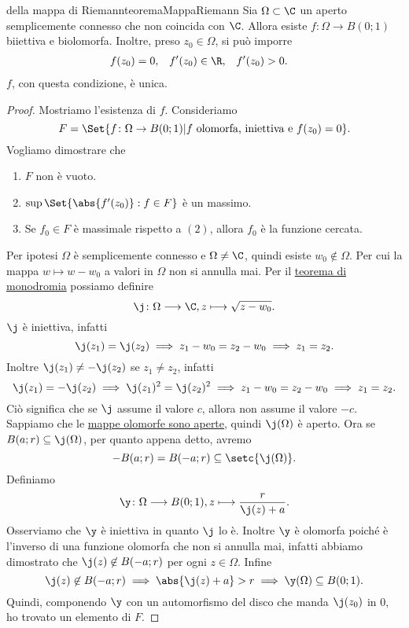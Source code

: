 \begin{teor}{della mappa di Riemann}{teoremaMappaRiemann}
	Sia \(\Omega\subset\C\) un aperto semplicemente connesso che non coincida con \(\C\).
	Allora esiste \(f\colon \Omega \to B(0;1)\) biiettiva e biolomorfa.
	Inoltre, preso \(z_0\in\Omega\), si può imporre
	\begin{align*}
		f(z_0) & = 0, & f'(z_0) & \in \R, & f'(z_0) & > 0.
	\end{align*}
	\(f\), con questa condizione, è unica.
\end{teor}

\begin{proof}
	Mostriamo l'esistenza di \(f\). Consideriamo
	\[
		F = \Set{f\colon \Omega \to B(0;1) | f\text{ olomorfa, iniettiva e }f(z_0)=0}.
	\]
	Vogliamo dimostrare che
	\begin{enumerate}
		\item \(F\) non è vuoto.
		\item \(\sup\Set{\abs{f'(z_0)}:f\in F}\) è un massimo.
		\item Se \(f_0\in F\) è massimale rispetto a \((2)\), allora \(f_0\) è la funzione cercata.
	\end{enumerate}
	Per ipotesi \(\Omega\) è semplicemente connesso e \(\Omega\neq \C\), quindi esiste \(w_0\not\in\Omega\).
	Per cui la mappa \(w\mapsto w-w_0\) a valori in \(\Omega\) non si annulla mai.
	Per il \hyperref[pr:determinazioneRadice]{teorema di monodromia} possiamo definire
	\[
		\j\colon \Omega \longrightarrow \C, z \longmapsto \sqrt{z-w_0}.
	\]
	\(\j\) è iniettiva, infatti
	\[
		\j(z_1) = \j(z_2) \implies z_1-w_0=z_2-w_0 \implies z_1 = z_2.
	\]
	Inoltre  \(\j(z_1)\neq -\j(z_2)\) se \(z_1\neq z_2\), infatti
	\[
		\j(z_1) = -\j(z_2) \implies \j(z_1)^2=\j(z_2)^2 \implies z_1-w_0 = z_2-w_0 \implies z_1 = z_2.
	\]
	Ciò significa che se \(\j\) assume il valore \(c\), allora non assume il valore \(-c\).
	Sappiamo che le \hyperref[th:funzioniOlomorfeAperte]{mappe olomorfe sono aperte}, quindi \(\j(\Omega)\) è aperto.
	Ora se \(B(a;r)\subseteq \j(\Omega)\), per quanto appena detto, avremo
	\[
		-B(a;r) = B(-a;r) \subseteq \setc{\j(\Omega)}.
	\]
	Definiamo
	\[
		\y\colon \Omega \longrightarrow B(0;1), z \longmapsto \frac{r}{\j(z)+a}.
	\]
	Osserviamo che \(\y\) è iniettiva in quanto \(\j\) lo è.
	Inoltre \(\y\) è olomorfa poiché è l'inverso di una funzione olomorfa che non si annulla mai, infatti abbiamo dimostrato che \(\j(z)\not\in B(-a;r)\) per ogni \(z\in\Omega\).
	Infine
	\[
		\j(z) \not\in B(-a;r) \implies \abs{\j(z)+a} > r \implies \y(\Omega) \subseteq B(0;1).
	\]
	Quindi, componendo \(\y\) con un automorfismo del disco che manda \(\j(z_0)\) in \(0\), ho trovato un elemento di \(F\).
	

\end{proof}

